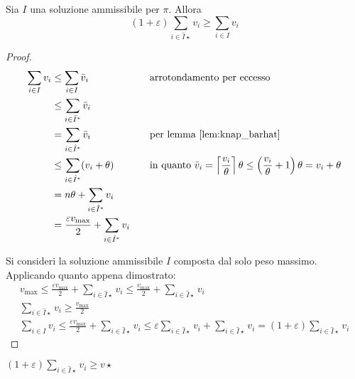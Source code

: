 \begin{lemma}
	Sia $I$ una soluzione ammissibile per $\pi$. Allora
	\begin{equation*}
		(1+\varepsilon)\sum_{i\in\hat I\star} v_i \geq \sum_{i\in I} v_i
	\end{equation*}
\end{lemma}
\begin{proof}
	\begin{align*}
		\sum_{i\in I} v_i & \leq \sum_{i\in I} \bar v_i                                   &  & \quad \text{arrotondamento per eccesso}      \\
		                  & \leq \sum_{ i\in\bar I^*} \bar v_i                                                                           \\
		                  & = \sum_{ i\in\hat I^*} \bar v_i                            &  & \quad \text{per lemma \ref{lem:knap_barhat}} \\
		                  & \leq \sum_{i\in\hat I^*} (v_i+\theta)                      &  & \quad \text{in quanto
		$\bar v_i=\left\lceil \frac{v_i}{\theta} \right\rceil\theta\leq\left(\frac{v_i}{\theta}+1\right)\theta=v_i+\theta$}                                   \\
		                  & = n\theta+\sum_{i\in\hat I^*} v_i                                                                            \\
		                  & = \frac{\varepsilon v_{\max}}{2} + \sum_{i\in\hat I^*} v_i
	\end{align*}

	Si consideri la soluzione ammissibile $I$ composta dal solo peso massimo. Applicando quanto appena dimostrato:
	\begin{gather*}
		v_{\max} \leq \frac{\varepsilon v_{\max}}{2} + \sum_{i\in\hat I\star} v_i \leq \frac{v_{\max}}{2} + \sum_{i\in\hat I\star} v_i \\
		\sum_{i\in\hat I\star} v_i \geq \frac{v_{\max}}{2} \\
		\sum_{i\in I} v_i \leq \frac{\varepsilon v_{\max}}{2} + \sum_{i\in\hat I\star} v_i
		\leq \varepsilon\sum_{i\in\hat I\star} v_i + \sum_{i\in\hat I\star} v_i = (1+\varepsilon)\sum_{i\in\hat I\star} v_i
	\end{gather*}
\end{proof}
\begin{corollario}\label{corol:knapapprox}
	$\displaystyle(1+\varepsilon)\sum_{i\in\hat I\star} v_i \geq v\star$
\end{corollario}

